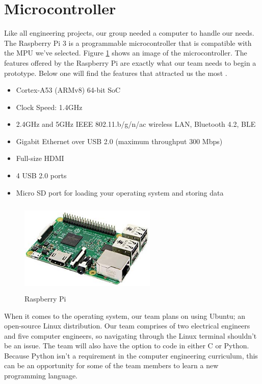 \section{Microcontroller}
Like all engineering projects, our group needed a computer to handle our needs. The Raspberry Pi 3 is a programmable microcontroller that is compatible with the MPU we've selected. Figure \ref{rasp} shows an image of the microcontroller. The features offered by the Raspberry Pi are exactly what our team needs to begin a prototype. Below one will find the features that attracted us the most \cite{pi}. \hfill\newline
\begin{itemize}
    \item Cortex-A53 (ARMv8) 64-bit SoC
    \item Clock Speed: 1.4GHz
    \item 2.4GHz and 5GHz IEEE 802.11.b/g/n/ac wireless LAN, Bluetooth 4.2, BLE
    \item Gigabit Ethernet over USB 2.0 (maximum throughput 300 Mbps)
    \item Full-size HDMI
    \item 4 USB 2.0 ports
    \item Micro SD port for loading your operating system and storing data
\end{itemize}

\begin{figure}[H]
\centering
\includegraphics[width = 6.5cm,height = 4.5cm]{graphics/Raspberry.PNG}
\caption{Raspberry Pi}
\label{rasp}
\end{figure}

When it comes to the operating system, our team plans on using Ubuntu; an open-source Linux distribution. Our team comprises of two electrical engineers and five computer engineers, so navigating through the Linux terminal shouldn't be an issue. The team will also have the option to code in either C or Python. Because Python isn't a requirement in the computer engineering curriculum, this can be an opportunity for some of the team members to learn a new programming language.